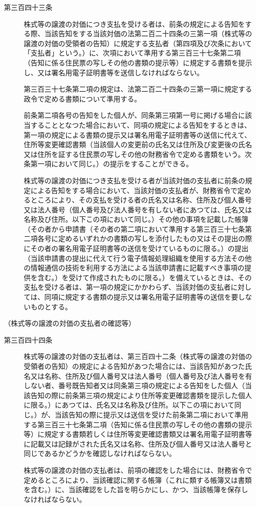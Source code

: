 \documentclass[twocolumn,a4j,10pt]{ltjtarticle}
\begin{document}
\begin{description}
\item[第三百四十三条]株式等の譲渡の対価につき支払を受ける者は、前条の規定による告知をする際、当該告知をする当該対価の法第二百二十四条の三第一項（株式等の譲渡の対価の受領者の告知）に規定する支払者（第四項及び次条において「支払者」という。）に、次項において準用する第三百三十七条第二項（告知に係る住民票の写しその他の書類の提示等）に規定する書類を提示し、又は署名用電子証明書等を送信しなければならない。
\item[]第三百三十七条第二項の規定は、法第二百二十四条の三第一項に規定する政令で定める書類について準用する。
\item[]前条第二項各号の告知をした個人が、同条第三項第一号に掲げる場合に該当することとなつた場合において、同項の規定による告知をするときは、第一項の規定による書類の提示又は署名用電子証明書等の送信に代えて、住所等変更確認書類（当該個人の変更前の氏名又は住所及び変更後の氏名又は住所を証する住民票の写しその他の財務省令で定める書類をいう。次条第一項において同じ。）の提示をすることができる。
\item[]株式等の譲渡の対価につき支払を受ける者が当該対価の支払者に前条の規定による告知をする場合において、当該対価の支払者が、財務省令で定めるところにより、その支払を受ける者の氏名又は名称、住所及び個人番号又は法人番号（個人番号及び法人番号を有しない者にあつては、氏名又は名称及び住所。以下この項において同じ。）その他の事項を記載した帳簿（その者から申請書（その者の第二項において準用する第三百三十七条第二項各号に定めるいずれかの書類の写しを添付したもの又はその提出の際にその者の署名用電子証明書等の送信を受けているものに限る。）の提出（当該申請書の提出に代えて行う電子情報処理組織を使用する方法その他の情報通信の技術を利用する方法による当該申請書に記載すべき事項の提供を含む。）を受けて作成されたものに限る。）を備えているときは、その支払を受ける者は、第一項の規定にかかわらず、当該対価の支払者に対しては、同項に規定する書類の提示又は署名用電子証明書等の送信を要しないものとする。
\end{description}
\noindent\hspace{10pt}（株式等の譲渡の対価の支払者の確認等）
\begin{description}
\item[第三百四十四条]株式等の譲渡の対価の支払者は、第三百四十二条（株式等の譲渡の対価の受領者の告知）の規定による告知があつた場合には、当該告知があつた氏名又は名称、住所及び個人番号又は法人番号（個人番号及び法人番号を有しない者、番号既告知者又は同条第三項の規定による告知をした個人（当該告知の際に前条第三項の規定により住所等変更確認書類を提示した個人に限る。）にあつては、氏名又は名称及び住所。以下この項において同じ。）が、当該告知の際に提示又は送信を受けた前条第二項において準用する第三百三十七条第二項（告知に係る住民票の写しその他の書類の提示等）に規定する書類若しくは住所等変更確認書類又は署名用電子証明書等に記載又は記録がされた氏名又は名称、住所及び個人番号又は法人番号と同じであるかどうかを確認しなければならない。
\item[]株式等の譲渡の対価の支払者は、前項の確認をした場合には、財務省令で定めるところにより、当該確認に関する帳簿（これに類する帳簿又は書類を含む。）に、当該確認をした旨を明らかにし、かつ、当該帳簿を保存しなければならない。
\end{description}
\end{document}
